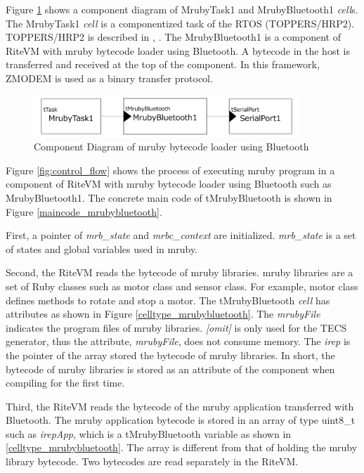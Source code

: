 \documentclass[a4j,12pt,oneside,openany,english]{jsbook}
\begin{document}
Figure \ref{fig:component_bluetooth} shows a component diagram of MrubyTask1 and MrubyBluetooth1 {\it cell}s.
The MrubyTask1 {\it cell} is a componentized task of the RTOS (TOPPERS/HRP2).
TOPPERS/HRP2 is described in \cite{url:HRP2}, \cite{par:hr-tecs}.
The MrubyBluetooth1 is a component of RiteVM with mruby bytecode loader using Bluetooth.
A bytecode in the host is transferred and received at the top of the component.
In this framework, ZMODEM \cite{par:zmodem} is used as a binary transfer protocol.

\begin{figure}[t]
    \centering
    \includegraphics[width=10cm,clip]{../EMSOFT2016/figure/component_bluetooth.pdf}
    \caption{Component Diagram of mruby bytecode loader using Bluetooth}
    \label{fig:component_bluetooth}
\end{figure}

Figure \ref{fig:control_flow} shows the process of executing mruby program in a component of RiteVM with mruby bytecode loader using Bluetooth such as MrubyBluetooth1.
The concrete main code of tMrubyBluetooth is shown in Figure \ref{maincode_mrubybluetooth}.

First, a pointer of {\it mrb\_state} and {\it mrbc\_context} are initialized.
{\it mrb\_state} is a set of states and global variables used in mruby.

Second, the RiteVM reads the bytecode of mruby libraries.
mruby libraries are a set of Ruby classes such as motor class and sensor class.
For example, motor class defines methods to rotate and stop a motor.
The tMrubyBluetooth {\it cell} has attributes as shown in Figure \ref{celltype_mrubybluetooth}.
The {\it mrubyFile} indicates the program files of mruby libraries.
{\it [omit]} is only used for the TECS generator, thus the attribute, {\it mrubyFile}, does not consume memory.
The {\it irep} is the pointer of the array stored the bytecode of mruby libraries.
In short, the bytecode of mruby libraries is stored as an attribute of the component when compiling for the first time.

Third, the RiteVM reads the bytecode of the mruby application transferred with Bluetooth.
The mruby application bytecode is stored in an array of type uint8\_t such as {\it irepApp}, which is a tMrubyBluetooth variable as shown in \ref{celltype_mrubybluetooth}.
The array is different from that of holding the mruby library bytecode.
Two bytecodes are read separately in the RiteVM.
\end{document}
